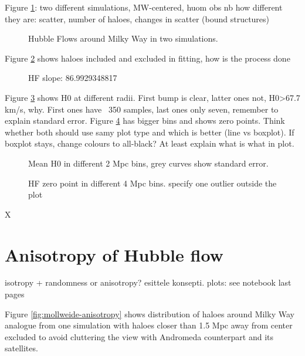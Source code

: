 \documentclass[english, oneside]{HYgradu}
\begin{document}
Figure \ref{fig:hubblediagrams}: two different simulations, MW-centered, huom obs nb how different they are: scatter, number of haloes, changes in scatter (bound structures)

\begin{figure}
    \centering
    
    \caption{Hubble Flows around Milky Way in two simulations.}\label{fig:hubblediagrams}
\end{figure}

Figure \ref{fig:hubblefit} shows haloes included and excluded in fitting, how is the process done

\begin{figure}
    \centering
    
    \caption{HF slope: 86.9929348817}\label{fig:hubblefit}
\end{figure}

Figure \ref{fig:shelledH0} shows H0 at different radii. First bump is clear, latter ones not, H0>67.7 km/s, why. First ones have ~350 samples, last ones only seven, remember to explain standard error. Figure \ref{fig:zeros} has bigger bins and shows zero points. Think whether both should use samy plot type and which is better (line vs boxplot). If boxplot stays, change colours to all-black? At least explain what is what in plot.

\begin{figure}
    \centering
    
    \caption{Mean H0 in different 2 Mpc bins, grey curves show standard error.}\label{fig:shelledH0}
\end{figure}

\begin{figure}
    \centering
    
    \caption{HF zero point in different 4 Mpc bins. specify one outlier outside the plot}\label{fig:zeros}
\end{figure}


X\section{Anisotropy of Hubble flow}
isotropy + randomness or anisotropy? esittele konsepti. plots: see notebook last pages

\reversemarginpar
{}
Figure \ref{fig:mollweide-anisotropy} shows distribution of haloes around Milky Way analogue from one simulation with haloes closer than 1.5 Mpc away from center excluded to avoid cluttering the view with Andromeda counterpart and its satellites.
\end{document}
